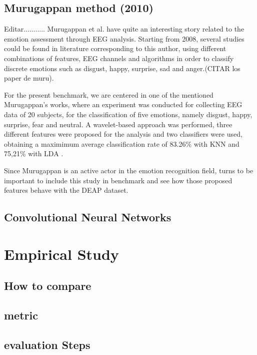 \documentclass{sig-alternate}
\begin{document}
\subsection{Murugappan method (2010)}	
Editar...........
Murugappan et al. have quite an interesting story related to the emotion assessment through EEG analysis. Starting from 2008, several studies could be found in literature corresponding to this author, using different combinations of features, EEG channels and algorithms in order to classify discrete emotions such as disgust, happy, surprise, sad and anger.(CITAR los paper de muru).

For the present benchmark, we are centered in one of the mentioned Murugappan's works, where an experiment was conducted for collecting EEG data of 20 subjects, for the classification of five emotions, namely disgust, happy, surprise, fear and neutral. A wavelet-based approach was performed, three different features were proposed for the analysis and two classifiers were used, obtaining a maximimum average classification rate of 83.26\% with KNN and 75,21\% with LDA \cite{Murugappan2010Classification}.

Since Murugappan is an active actor in the emotion recognition field, turns to be important to include this study in benchmark and see how those proposed features behave with the DEAP dataset.

\subsection{Convolutional Neural Networks}

\cite{lecun1995convolutional}
\cite{zheng2014time}
\cite{stober2014using}
\cite{stober2014classifying}
\cite{xing2010brief}

\section{Empirical Study}

\subsection{How to compare} 

\subsection{metric} 

\subsection{evaluation Steps}
\end{document}
